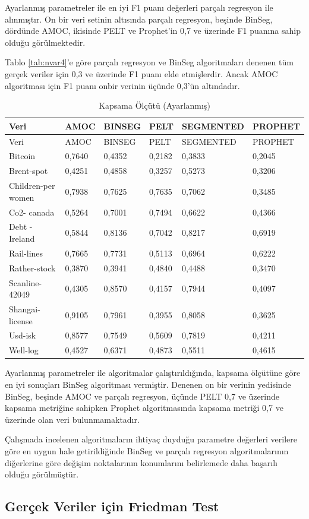 \documentclass[12pt,twoside]{deuthesis}
\begin{document}
Ayarlanmış parametreler ile en iyi F1 puanı değerleri parçalı regresyon ile alınmıştır. On bir veri setinin altısında parçalı regresyon, beşinde BinSeg, dördünde AMOC, ikisinde PELT ve Prophet'in 0,7 ve üzerinde F1 puanına sahip olduğu görülmektedir.

Tablo \ref{tab:nvar4}'e göre parçalı regresyon ve BinSeg algoritmaları denenen tüm gerçek veriler için 0,3 ve üzerinde F1 puanı elde etmişlerdir. Ancak AMOC algoritması için F1 puanı onbir verinin üçünde 0,3'ün altındadır.

\begin{longtable}[]{@{}llllll@{}}
\caption{\label{tab:nvar5} Kapsama Ölçütü (Ayarlanmış)}\tabularnewline
\toprule
Veri & AMOC & BINSEG & PELT & SEGMENTED & PROPHET\tabularnewline
\midrule
\endfirsthead
\toprule
Veri & AMOC & BINSEG & PELT & SEGMENTED & PROPHET\tabularnewline
\midrule
\endhead
Bitcoin & 0,7640 & 0,4352 & 0,2182 & 0,3833 & 0,2045\tabularnewline
Brent-spot & 0,4251 & 0,4858 & 0,3257 & 0,5273 & 0,3206\tabularnewline
Children-per women & 0,7938 & 0,7625 & 0,7635 & 0,7062 & 0,3485\tabularnewline
Co2- canada & 0,5264 & 0,7001 & 0,7494 & 0,6622 & 0,4366\tabularnewline
Debt -Ireland & 0,5844 & 0,8136 & 0,7042 & 0,8217 & 0,6919\tabularnewline
Rail-lines & 0,7665 & 0,7731 & 0,5113 & 0,6964 & 0,6222\tabularnewline
Rather-stock & 0,3870 & 0,3941 & 0,4840 & 0,4488 & 0,3470\tabularnewline
Scanline-42049 & 0,4305 & 0,8570 & 0,4157 & 0,7944 & 0,4097\tabularnewline
Shangai-license & 0,9105 & 0,7961 & 0,3955 & 0,8058 & 0,3625\tabularnewline
Usd-isk & 0,8577 & 0,7549 & 0,5609 & 0,7819 & 0,4211\tabularnewline
Well-log & 0,4527 & 0,6371 & 0,4873 & 0,5511 & 0,4615\tabularnewline
\bottomrule
\end{longtable}

Ayarlanmış parametreler ile algoritmalar çalıştırıldığında, kapsama ölçütüne göre en iyi sonuçları BinSeg algoritması vermiştir. Denenen on bir verinin yedisinde BinSeg, beşinde AMOC ve parçalı regresyon, üçünde PELT 0,7 ve üzerinde kapsama metriğine sahipken Prophet algoritmasında kapsama metriği 0,7 ve üzerinde olan veri bulunmamaktadır.

Çalışmada incelenen algoritmaların ihtiyaç duyduğu parametre değerleri verilere göre en uygun hale getirildiğinde BinSeg ve parçalı regresyon algoritmalarının diğerlerine göre değişim noktalarının konumlarını belirlemede daha başarılı olduğu görülmüştür.

\hypertarget{geruxe7ek-veriler-iuxe7in-friedman-test}{%
\subsection{Gerçek Veriler için Friedman Test}\label{geruxe7ek-veriler-iuxe7in-friedman-test}}
\end{document}
